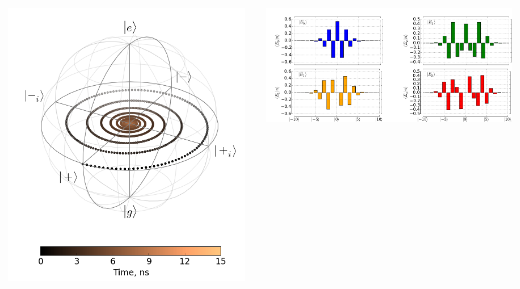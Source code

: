 \documentclass[aspectratio=169, 13pt, t]{beamer}
\begin{document}
{\begin{columns}[c]
		\hspace{-2cm}\includegraphics[height=0.3\textheight]{qdeph_bloch}
    
    	\hspace{-2cm}\includegraphics[height=0.3\textheight]{tr_CPD}

  \end{columns}
}
\addtocounter{page}{-1}

\AtBeginSection[]
{
  \begin{frame}[plain]
    \tableofcontents[currentsection]
    \addtocounter{page}{-1}
  \end{frame}
}
\end{document}
